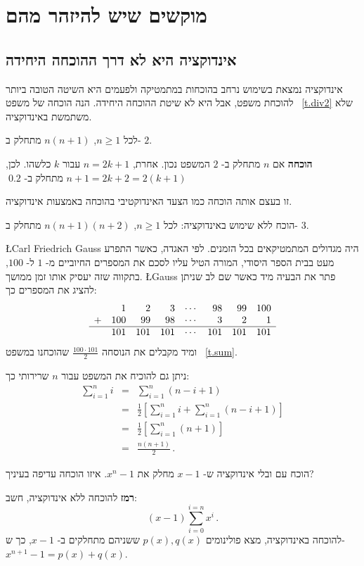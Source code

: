 
\chapter{%
מוקשים שיש להיזהר מהם
}\label{s.watch}

\section{%
אינדוקציה היא לא דרך ההוכחה היחידה%
}

אינדוקציה נמצאת בשימוש נרחב בהוכחות במתמטיקה ולפעמים היא השיטה הטובה ביותר להוכחת משפט, אבל היא לא שיטת ההוכחה היחידה. הנה הוכחה של משפט~%
\ref{t.div2}
שלא משתמשת באינדוקציה.
\begin{theorem}
לכל
$n\geq 1$, $n(n+1)$
מתחלק ב-%
$2$.
\end{theorem}

\textbf{הוכחה} 
אם
$n$
מתחלק ב-%
$2$
המשפט נכון. אחרת,
$n=2k+1$
עבור
$k$
כלשהו. לכן,
$n+1=2k+2=2(k+1)$
מתחלק ב-%
$2$.\qed

זו בעצם אותה הוכחה כמו הצעד האינדוקטיבי בהוכחה באמצעות אינדוקציה.
\begin{exercise}
הוכח ללא שימוש באינדוקציה: לכל
$n\geq 1$, $n(n+1)(n+2)$
מתחלק ב-%
$3$.
\end{exercise}


\L{Carl Friedrich Gauss}
היה מגדולים המתמטיקאים בכל הזמנים. לפי האגדה, כאשר התפרע מעט בבית הספר היסודי, המורה הטיל עליו לסכם את המספרים החיוביים מ-
$1$
ל-%
$100$,
בתקווה שזה יעסיק אותו זמן ממושך.
\L{Gauss}
פתר את הבעיה מיד כאשר שם לב שניתן להציג את המספרים כך:
\[
\begin{array}{crrrrrrr}
& 1 & 2 & 3 & \cdots & 98 & 99 & 100\\
+& 100 & 99 & 98 & \cdots & 3 & 2 & 1\\
\hline
& 101 & 101 & 101 & \cdots & 101 & 101 & 101\\
\end{array}
\]
ומיד מקבלים את הנוסחה
$\frac{100\cdot 101}{2}$
שהוכחנו במשפט~%
\ref{t.sum}. 

ניתן גם להוכיח את המשפט עבור
$n$
שרירותי כך:
\begin{eqnarray*}
\sum_{i=1}^{n} i &=& \sum_{i=1}^{n} (n-i+1)\\
&=& \frac{1}{2}\left[\sum_{i=1}^{n} i + \sum_{i=1}^{n} (n-i+1)\right]\\
&=& \frac{1}{2}\left[\sum_{i=1}^{n} (n+1)\right]\\
&=& \frac{n(n+1)}{2}\,.
\end{eqnarray*}
\vspace*{-3ex}
\begin{exercise}
הוכח עם ובלי אינדוקציה ש-%
$x-1$
מחלק את
$x^n-1$.
איזו הוכחה עדיפה בעיניך?
\end{exercise}
\textbf{רמז}
להוכחה ללא אינדוקציה, חשב:
\[
(x-1)\sum_{i=0}^{i=n}x^i\,.
\]
להוכחה באינדוקציה, מצא פולינומים
$p(x),q(x)$
ששניהם מתחלקים ב-%
$x-1$,
כך ש-%
$x^{n+1} - 1 =p(x)+q(x)$.

